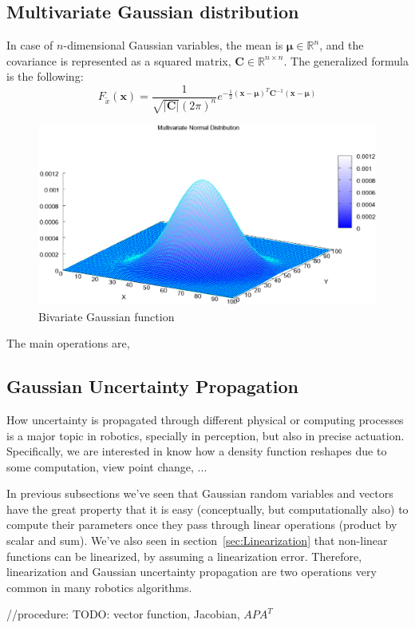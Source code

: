 
\subsection{Multivariate Gaussian distribution}
In case of $n$-dimensional Gaussian variables, the mean is $\boldsymbol{\mu} \in \mathbb{R}^n$, and the covariance is represented as a squared matrix, $\mathbf{C}\in\mathbb{R}^{n\times n}$. The generalized formula is the following: 
\begin{equation}
 F_{\tilde{x}}(\mathbf{x}) = \frac{1}{\sqrt{\vert \mathbf{C}\vert}(2\pi)^n}
			    e^{-\frac{1}{2}(\mathbf{x}-\boldsymbol\mu)^T\mathbf{C}^{-1}(\mathbf{x}-\boldsymbol\mu)}
\end{equation}

\begin{figure}[bth!]
  \begin{center}
    \includegraphics[width=1.0\columnwidth]{figures/mv_gaussian.eps}
    \caption{Bivariate Gaussian function}
    \label{fig:trigonometry}
  \end{center}
\end{figure}

The main operations are,



\subsection{Gaussian Uncertainty Propagation}
How uncertainty is propagated through different physical or computing processes is a major topic in robotics, specially in perception, but also in precise actuation. Specifically, we are interested in know how a density function reshapes due to some computation, view point change, ...

In previous subsections we've seen that Gaussian random variables and vectors have the great property that it is easy (conceptually, but computationally also) to compute their parameters once they pass through linear operations (product by scalar and sum). We've also seen in section~\ref{sec:Linearization} that non-linear functions can be linearized, by assuming a linearization error. Therefore, linearization and Gaussian uncertainty propagation are two operations very common in many robotics algorithms. 

//procedure: TODO: vector function, Jacobian, $APA^T$


